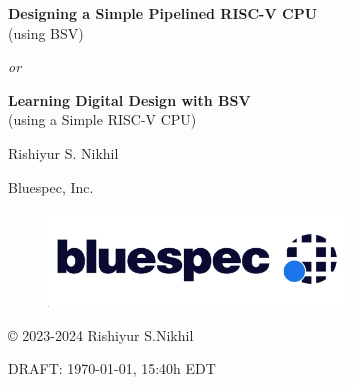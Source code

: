 
\pagestyle{empty}

\begin{center}

\vspace*{1.5in}

{\LARGE\bf Designing a Simple Pipelined RISC-V CPU} \\
{\Large (using BSV)}

\emph{or}

{\LARGE\bf Learning Digital Design with BSV} \\
{\Large (using a Simple RISC-V CPU)}

\vspace{2cm}

{\Large Rishiyur S. Nikhil}

Bluespec, Inc.

\vspace*{0.5in}

\begin{figure}[htbp]
  \centerline{\includegraphics[height=1in,angle=0]{ch000_front/Bluespec_Logo_2022-10}}
\end{figure}

\vspace*{0.5in}

\copyright{} 2023-2024 Rishiyur S.Nikhil

\vspace{1in}

{\small DRAFT: \today, 15:40h EDT}

\end{center}


% 



\vspace*{2in}


% 


\newpage

\pagestyle{myheadings}


{\small

\tableofcontents

}




